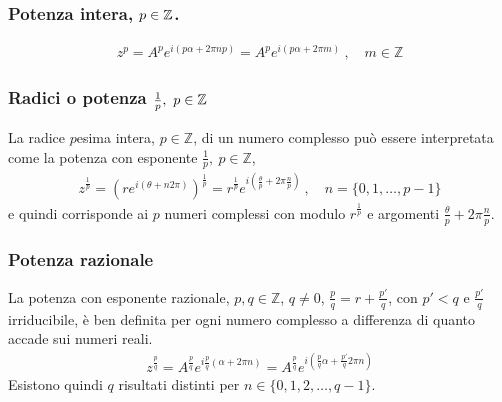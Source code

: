 \documentclass[letterpaper,10pt,italian]{jupyterBook}
\begin{document}
\subsubsection{Potenza intera, \protect\(p \in \mathbb{Z}\protect\).}
\label{\detokenize{ch/algebra/complex-algebra:potenza-intera-p-in-mathbb-z}}\begin{equation*}
\begin{split}z^p = A^p e^{i ( p \alpha + 2 \pi n p )} = A^{p} e^{i ( p \alpha + 2 \pi m )} \ , \quad m \in \mathbb{Z}\end{split}
\end{equation*}

\subsubsection{Radici o potenza \protect\(\frac{1}{p}, \ p \in \mathbb{Z}\protect\)}
\label{\detokenize{ch/algebra/complex-algebra:radici-o-potenza-frac-1-p-p-in-mathbb-z}}
\sphinxAtStartPar
La radice \(p\)\sphinxhyphen{}esima intera, \(p \in \mathbb{Z}\), di un numero complesso può essere interpretata come la potenza con esponente \(\frac{1}{p}, \ p \in \mathbb{Z}\),
\begin{equation*}
\begin{split}z^{\frac{1}{p}} = \left( r e^{i ( \theta + n 2 \pi ) } \right)^\frac{1}{p} = r^{\frac{1}{p}} e^{i \left(\frac{\theta}{p} + 2 \pi \frac{n}{p} \right)} \ , \quad n = \{ 0, 1, \dots, p-1\}\end{split}
\end{equation*}
\sphinxAtStartPar
e quindi corrisponde ai \(p\) numeri complessi con modulo \(r^{\frac{1}{p}}\) e argomenti \(\frac{\theta}{p} + 2 \pi \frac{n}{p}\).


\subsubsection{Potenza razionale}
\label{\detokenize{ch/algebra/complex-algebra:potenza-razionale}}
\sphinxAtStartPar
La potenza con esponente razionale, \(p, q \in \mathbb{Z}\), \(q \ne 0\), \(\frac{p}{q} = r + \frac{p'}{q}\), con \(p' < q\) e \(\frac{p'}{q}\) irriducibile, è ben definita per ogni numero complesso a differenza di quanto accade sui numeri reali.
\begin{equation*}
\begin{split}z^{\frac{p}{q}} = A^{\frac{p}{q}} e^{i \frac{p}{q} (\alpha + 2 \pi n)} = A^{\frac{p}{q}} e^{i (\frac{p}{q} \alpha + \frac{p'}{q} 2 \pi n)}\end{split}
\end{equation*}
\sphinxAtStartPar
Esistono quindi \(q\) risultati distinti per \(n \in \{ 0, 1, 2, \dots, q-1 \}\).
\end{document}
